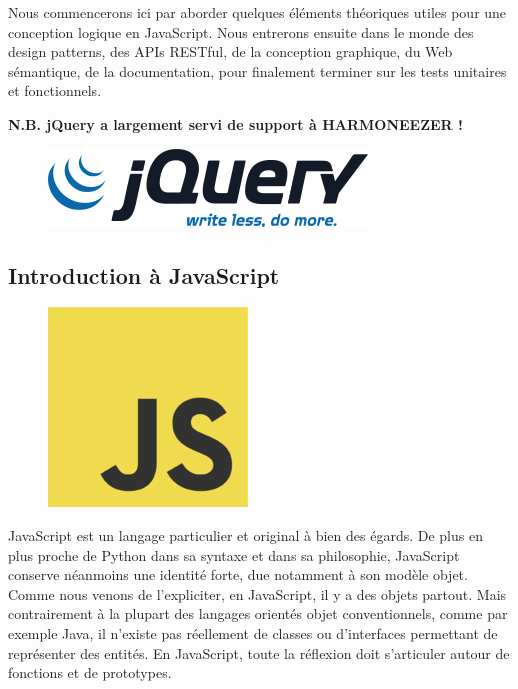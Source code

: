 \documentclass[a4paper,12pt]{article}
\begin{document}
Nous commencerons ici par aborder quelques éléments théoriques utiles pour une conception logique en JavaScript. Nous entrerons ensuite dans le monde des design patterns, des APIs RESTful, de la conception graphique, du Web sémantique, de la documentation, pour finalement terminer sur les tests unitaires et fonctionnels.

\textbf{N.B. jQuery a largement servi de support à HARMONEEZER !}

\begin{figure}[!h]
  \begin{center}
    \includegraphics[scale=0.3]{logo-jquery.png}
  \end{center}
\end{figure}

\subsection{Introduction à JavaScript}

\begin{figure}[!h]
  \begin{center}
    \includegraphics[scale=0.3]{logo-javascript.png}
  \end{center}
\end{figure}

JavaScript est un langage particulier et original à bien des égards. De plus en plus proche de Python dans sa syntaxe et dans sa philosophie, JavaScript conserve néanmoins une identité forte, due notamment à son modèle objet. Comme nous venons de l'expliciter, en JavaScript, il y a des objets partout. Mais contrairement à la plupart des langages orientés objet conventionnels, comme par exemple Java, il n'existe pas réellement de classes ou d'interfaces permettant de représenter des entités. En JavaScript, toute la réflexion doit s'articuler autour de fonctions et de prototypes.
\end{document}
